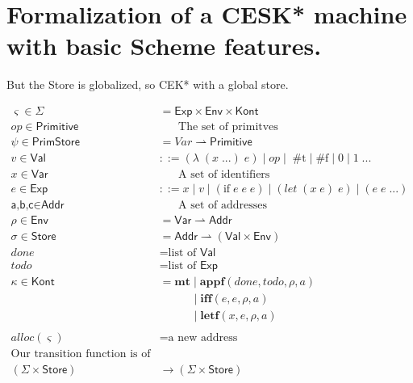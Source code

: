 \documentclass[12pt,draft]{article}
\begin{document}

\section{Formalization of a CESK* machine with basic Scheme features.}

But the Store is globalized, so CEK* with a global store.


\begin{align*}
\varsigma \in \Sigma &= \textsf{Exp} \times \textsf{Env} \times \textsf{Kont} \\
op \in \textsf{Primitive} &\;\;\;\;\;\; \text{The set of primitves} \\
\psi \in \textsf{PrimStore} &= Var \rightharpoonup \textsf{Primitive} \\
v \in \textsf{Val} &::= (\lambda \; (x \; ...) \; e) \;|\; op \;|\; \;\text{\#t}\; | \;\text{\#f}\; | \;0\; | \;1\; ... \\
x \in \textsf{Var} &\;\;\;\;\;\; \text{A set of identifiers} \\
e \in \textsf{Exp} &::= x  \;|\; v \;|\; (\text{if} \; e \; e \; e) \;|\; (let \; (x \; e) \; e) \;|\; (e \; e \; ...)  \\
\textsf{a,b,c} \in \textsf{Addr} &\;\;\;\;\;\; \text{A set of addresses} \\
\rho \in \textsf{Env} &= \textsf{Var} \rightharpoonup \textsf{Addr} \\
\sigma \in \textsf{Store} &= \textsf{Addr} \rightharpoonup (\textsf{Val} \times \textsf{Env}) \\
done &= \text{list of } \textsf{Val} \\
todo &= \text{list of } \textsf{Exp} \\
\kappa \in \textsf{Kont} &= \textbf{mt} \;|\; \textbf{appf}(done, todo, \rho, a) \\
					   &	\;\;\;\;\;\;\;\;\;\; \;|\; \textbf{iff}(e, e, \rho, a) \\
					   &	\;\;\;\;\;\;\;\;\;\; \;|\; \textbf{letf}(x, e, \rho, a) \\
\\
alloc(\varsigma) &= \text{a new address} \\
\text{Our transition function is of type} \\
(\Sigma \times \textsf{Store}) &\rightarrow (\Sigma \times \textsf{Store})
\end{align*}
\end{document}
